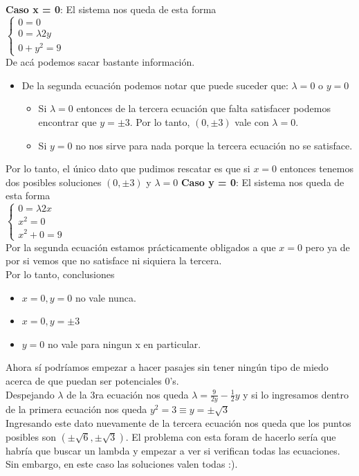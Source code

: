 \documentclass[10pt,a4paper]{article}
\begin{document}
\textbf{Caso x = 0}: El sistema nos queda de esta forma \\ 
$\begin{cases}
   0 = 0 \\ 
   0 = \lambda 2y \\
   0 + y^{2} = 9
\end{cases}$ \\
De acá podemos sacar bastante información. 
\begin{itemize}
    \item De la segunda ecuación podemos notar que puede suceder que: $\lambda = 0$ o $y = 0$
    \begin{itemize}
        \item Si $\lambda = 0$ entonces de la tercera ecuación que falta satisfacer podemos encontrar que $y = \pm 3$. Por lo tanto, $(0, \pm 3)$ vale con $\lambda = 0$.
        \item Si $y = 0$ no nos sirve para nada porque la tercera ecuación no se satisface.
    \end{itemize}
\end{itemize}
Por lo tanto, el único dato que pudimos rescatar es que si $x = 0$ entonces tenemos dos posibles soluciones $(0, \pm 3)$ y $\lambda = 0$
\textbf{Caso y = 0}: El sistema nos queda de esta forma \\
$\begin{cases}
   0 = \lambda 2x \\ 
   x^{2} = 0 \\
   x^{2} + 0 = 9
\end{cases}$ \\
Por la segunda ecuación estamos prácticamente obligados a que $x=0$ pero ya de por si vemos que no satisface ni siquiera la tercera. \\
Por lo tanto, conclusiones
\begin{itemize}
    \item $x = 0, y = 0$ no vale nunca.
    \item $x = 0, y = \pm 3$
    \item $y = 0$ no vale para ningun x en particular.
\end{itemize}
Ahora sí podríamos empezar a hacer pasajes sin tener ningún tipo de miedo acerca de que puedan ser potenciales 0's. \\
Despejando $\lambda$ de la 3ra ecuación nos queda $\lambda = \frac{9}{2y} - \frac{1}{2}y$ y si lo ingresamos dentro de la primera ecuación nos queda $y^{2} = 3 \equiv y = \pm \sqrt{3}$ \\
Ingresando este dato nuevamente de la tercera ecuación nos queda que los puntos posibles son $(\pm \sqrt{6}, \pm \sqrt{3})$. El problema con esta foram de hacerlo sería que habría que buscar un lambda y empezar a ver si verifican todas las ecuaciones. Sin embargo, en este caso las soluciones valen todas :).\\
\end{document}

